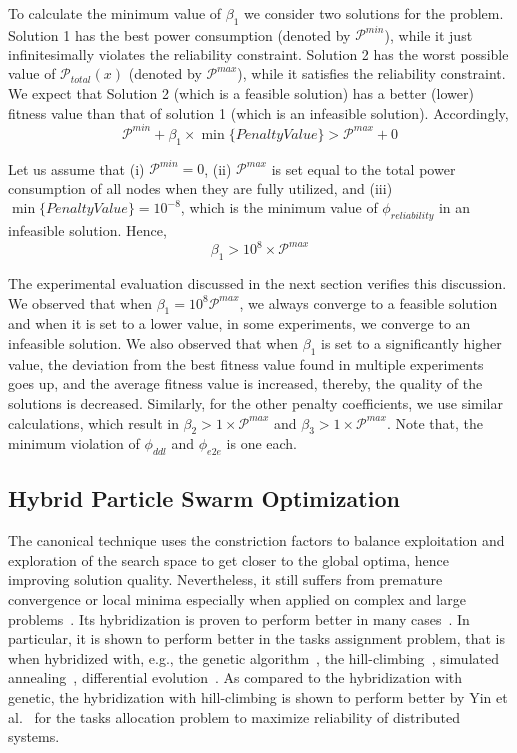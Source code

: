 To calculate the minimum value of $\beta_1$ we consider two solutions for the problem. Solution 1 has the best power consumption (denoted by $\mathcal{P}^{min}$), while it just infinitesimally violates the reliability constraint. Solution 2 has the worst possible value of $\mathcal{P}_{total}(x)$ (denoted by $\mathcal{P}^{max}$), while it satisfies the reliability constraint. We expect that Solution 2 (which is a feasible solution) has a better (lower) fitness value than that of solution 1 (which is an infeasible solution). Accordingly,
\begin{equation*}
\label{eqn_PnelatyMem1}
\mathcal{P}^{min} + \beta_1 \times \min\{Penalty Value\} > \mathcal{P}^{max} + 0
\end{equation*}  

Let us assume that (i) $\mathcal{P}^{min} = 0$, (ii) $\mathcal{P}^{max}$ is set equal to the total power consumption of all nodes when they are fully utilized, and (iii) $\min\{Penalty Value\} = 10^{-8}$, which is the minimum value of $\phi_{reliability}$ in an infeasible solution. Hence,
\begin{equation*}
\label{eqn_PnelatyMem2}
\beta_1 > 10^8 \times \mathcal{P}^{max}
\end{equation*}  

The experimental evaluation discussed in the next section verifies this discussion. We observed that when $\beta_1 = 10^8\mathcal{P}^{max}$, we always converge to a feasible solution and when it is set to a lower value, in some experiments, we converge to an infeasible solution. We also observed that when $\beta_1$ is set to a significantly higher value, the deviation from the best fitness value found in multiple experiments goes up, and the average fitness value is increased, thereby, the quality of the solutions is decreased. Similarly, for the other penalty coefficients, we use similar calculations, which result in $\beta_2 > 1 \times \mathcal{P}^{max}$ and
$\beta_3 > 1 \times \mathcal{P}^{max}$. Note that, the minimum violation of $\phi_{ddl}$ and $\phi_{e2e}$ is one each.

\subsection{Hybrid Particle Swarm Optimization}
The canonical \pso{} technique uses the constriction factors to balance exploitation and exploration of the search space to get closer to the global optima, hence improving solution quality. Nevertheless, it still suffers from premature convergence or local minima especially when applied on complex and large problems~\cite{Rini2011ParticleChallenges}. Its hybridization is proven to perform better in many cases~\cite{Sengupta2018ParticlePerspectives}. In particular, it is shown to perform better in the tasks assignment problem, that is when hybridized with, e.g., the genetic algorithm~\cite{Sailer2013OptimizingAUTOSAR}, the hill-climbing~\cite{yin2007task}, simulated annealing~\cite{Zhao2007ASystem}, differential evolution~\cite{Tasgetiren2006AProblem}. As compared to the hybridization with genetic, the hybridization with hill-climbing \hcpso{} is shown to perform better by Yin et al.~\cite{yin2007task} for the tasks allocation problem to maximize reliability of distributed systems. 

